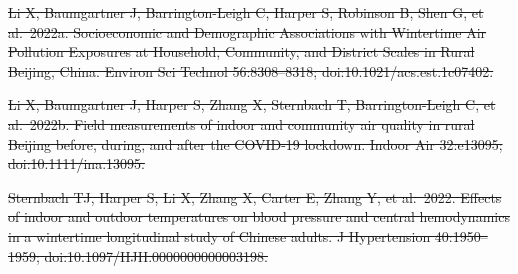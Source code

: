 \documentclass[
  letterpaper,
  DIV=11,
  numbers=noendperiod]{scrartcl}
\providecommand{\DIFdeltex}[1]{{\protect\color{red}\sout{#1}}}                      %
\providecommand{\DIFdelend}{} %
\providecommand{\DIFdel}[1]{\texorpdfstring{\DIFdeltex{#1}}{}} %
\DeclareRobustCommand{\DIFdelend}{\DIFOaddend \let\includegraphics\DIFOincludegraphics} %
\begin{document}
\DIFdel{Li X, Baumgartner J, Barrington-Leigh C, Harper S, Robinson B, Shen G,
et al.~2022a. Socioeconomic and Demographic Associations with Wintertime
Air Pollution Exposures at Household, Community, and District Scales in
Rural Beijing, China. Environ Sci Technol 56:8308--8318;
doi:10.1021/acs.est.1c07402.
}%

\DIFdel{Li X, Baumgartner J, Harper S, Zhang X, Sternbach T, Barrington-Leigh C,
et al.~2022b. Field measurements of indoor and community air quality in
rural Beijing before, during, and after the COVID-19 lockdown. Indoor
Air 32:e13095; doi:10.1111/ina.13095.
}%

\DIFdel{Sternbach TJ, Harper S, Li X, Zhang X, Carter E, Zhang Y, et al.~2022.
Effects of indoor and outdoor temperatures on blood pressure and central
hemodynamics in a wintertime longitudinal study of Chinese adults. J
Hypertension 40:1950--1959; doi:10.1097/HJH.0000000000003198.
}\DIFdelend 
\end{document}
